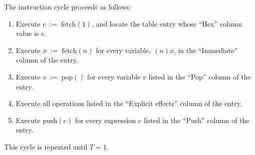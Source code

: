 \documentclass[a4paper,10pt]{article}
\newcommand{\TERM}{T}
\newcommand{\width}[2]{(#1)#2}
\newcommand{\set}[2]{#1\;:=\;#2}
\newcommand{\Push}[1]{\mathrm{push}(#1)}
\newcommand{\Pop}{\mathrm{pop}()}
\newcommand{\Fetch}[1]{\mathrm{fetch}(#1)}
\theoremstyle{definition}
\begin{document}
The instruction cycle proceeds as follows:
\begin{enumerate}
\item Execute $\set{c}{\Fetch{1}}$, and locate the table entry whose ``Hex'' column value is $c$.
\item Execute $\set{x}{\Fetch{n}}$ for every variable, $\width{n}{x}$, in the ``Immediate'' column of the entry.
\item Execute $\set{v}{\Pop{}}$ for every variable $v$ listed in the ``Pop'' column of the entry.
\item Execute all operations listed in the ``Explicit effects'' column of the entry.
\item Execute $\Push{e}$ for every expression $e$ listed in the ``Push'' column of the entry.
\end{enumerate}
This cycle is repeated until $\TERM=1$.
\end{document}
